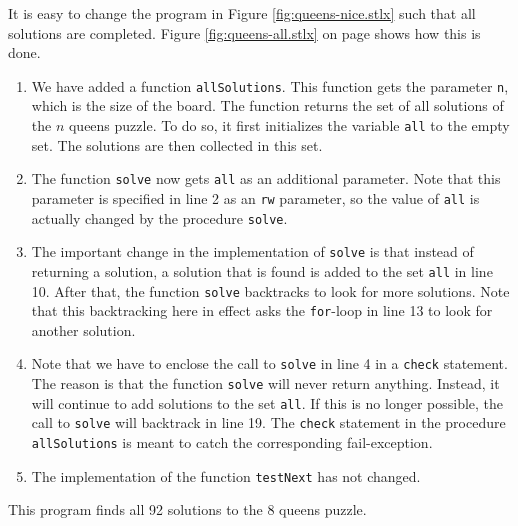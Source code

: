 It is easy to change the program in Figure \ref{fig:queens-nice.stlx} such that all
solutions are completed.   Figure \ref{fig:queens-all.stlx} on page
\pageref{fig:queens-all.stlx} shows how this is done.
\begin{enumerate}
\item We have added a function \texttt{allSolutions}.  This function gets the parameter
      \texttt{n}, which is the size of the board.
      The function returns the set of all solutions of the $n$ queens puzzle.
      To do so, it first initializes the variable \texttt{all} to the empty set.
      The solutions are then collected in this set.
\item The function \texttt{solve} now gets \texttt{all} as an additional parameter.
      Note that this parameter is specified in line 2 as an \texttt{rw} parameter, so 
      the value of \texttt{all} is actually changed by the procedure \texttt{solve}.
\item The important change in the implementation of \texttt{solve} is that instead of
      returning a solution,  a solution that is found is added to the set \texttt{all} in
      line 10. After that, the function \texttt{solve} backtracks to look for more
      solutions.   Note that this backtracking here in effect asks the \texttt{for}-loop in line 13 
      to look for another solution.
\item Note that we have to enclose the call to \texttt{solve} in line 4 in a \texttt{check}
      statement.  The reason is that the function \texttt{solve} will never return anything.
      Instead, it will continue to add solutions to the set \texttt{all}.   If this is no longer
      possible, the call to \texttt{solve} will backtrack in line 19.  The \texttt{check} statement 
      in the procedure \texttt{allSolutions} is meant to catch the corresponding fail-exception.

      

\item The implementation of the function \texttt{testNext} has not changed.
\end{enumerate}
This program finds all 92 solutions to the $8$ queens puzzle.

